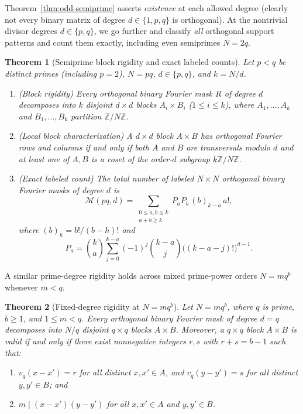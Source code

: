 \documentclass[11pt,reqno]{amsart}
\numberwithin{equation}{section}
\newtheorem{theorem}{Theorem}[section]
\theoremstyle{definition}
\theoremstyle{remark}
\newcommand{\Z}{\mathbb{Z}}
\begin{document}
Theorem~\ref{thm:odd-semiprime} asserts \emph{existence} at each allowed degree (clearly not every binary matrix of degree $d\in\{1,p,q\}$ is orthogonal). At the nontrivial divisor degrees $d\in\{p,q\}$, we go further and classify \emph{all} orthogonal support patterns and count them exactly, including even semiprimes $N=2q$.

\begin{theorem}[Semiprime block rigidity and exact labeled counts]
\label{thm:pq-rigidity}
Let $p<q$ be distinct primes (including $p=2$), $N=pq$, $d\in\{p,q\}$, and $k=N/d$.
\begin{enumerate}[label=(\alph*),leftmargin=2em]
\item \emph{(Block rigidity)} Every orthogonal binary Fourier mask $R$ of degree $d$ decomposes into $k$ disjoint $d\times d$ blocks $A_i\times B_i$ ($1\le i\le k$), where $A_1,\ldots,A_k$ and $B_1,\ldots,B_k$ partition $\Z/N\Z$.
\item \emph{(Local block characterization)} A $d\times d$ block $A\times B$ has orthogonal Fourier rows and columns if and only if both $A$ and $B$ are transversals modulo $d$ and at least one of $A,B$ is a coset of the order-$d$ subgroup $k\Z/N\Z$.
\item \emph{(Exact labeled count)} The total number of labeled $N\times N$ orthogonal binary Fourier masks of degree $d$ is
\begin{equation}
\label{eq:labeled-count}
\mathcal{M}(pq,d) = \sum_{\substack{0\le a,b\le k\\ a+b\ge k}} P_a P_b\, (b)_{k-a}\, a!,
\end{equation}
where $(b)_h = b!/(b-h)!$ and
\begin{equation}
\label{eq:Pa-def}
P_a = \binom{k}{a}\sum_{j=0}^{k-a} (-1)^j \binom{k-a}{j}\bigl((k-a-j)!\bigr)^{d-1}.
\end{equation}
\end{enumerate}
\end{theorem}

A similar prime-degree rigidity holds across mixed prime-power orders $N=mq^b$ whenever $m<q$.

\begin{theorem}[Fixed-degree rigidity at $N=mq^b$]
\label{thm:mqb}
Let $N=mq^b$, where $q$ is prime, $b\ge 1$, and $1\le m<q$. Every orthogonal binary Fourier mask of degree $d=q$ decomposes into $N/q$ disjoint $q\times q$ blocks $A\times B$. Moreover, a $q\times q$ block $A\times B$ is valid if and only if there exist nonnegative integers $r,s$ with $r+s=b-1$ such that:
\begin{enumerate}[label=(\roman*),leftmargin=2em]
\item $v_q(x-x')=r$ for all distinct $x,x'\in A$, and $v_q(y-y')=s$ for all distinct $y,y'\in B$; and
\item $m\mid (x-x')(y-y')$ for all $x,x'\in A$ and $y,y'\in B$.
\end{enumerate}
\end{theorem}
\end{document}
